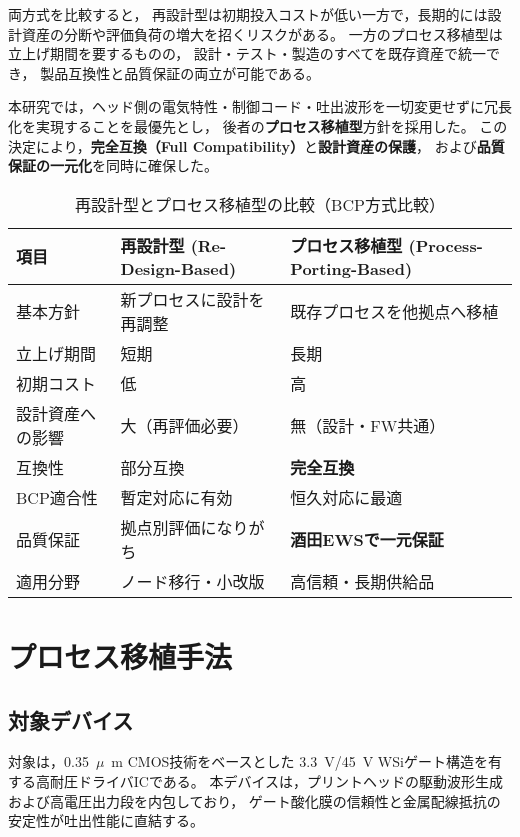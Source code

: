 \documentclass[conference]{IEEEtran}
\newcommand{\micro}{\ensuremath{\mu}}
\begin{document}
両方式を比較すると，
再設計型は初期投入コストが低い一方で，長期的には設計資産の分断や評価負荷の増大を招くリスクがある。
一方のプロセス移植型は立上げ期間を要するものの，
設計・テスト・製造のすべてを既存資産で統一でき，
製品互換性と品質保証の両立が可能である。

本研究では，ヘッド側の電気特性・制御コード・吐出波形を一切変更せずに冗長化を実現することを最優先とし，
後者の\textbf{プロセス移植型}方針を採用した。
この決定により，\textbf{完全互換（Full Compatibility）}と\textbf{設計資産の保護}，
および\textbf{品質保証の一元化}を同時に確保した。

\begin{table*}[t]
\centering
\caption{再設計型とプロセス移植型の比較（BCP方式比較）}
\label{tab:approach_compare}
\begin{tabular*}{\textwidth}{@{\extracolsep{\fill}} lll}
\toprule
\textbf{項目} & \textbf{再設計型 (Re-Design-Based)} & \textbf{プロセス移植型 (Process-Porting-Based)} \\
\midrule
基本方針 & 新プロセスに設計を再調整 & 既存プロセスを他拠点へ移植 \\
立上げ期間 & 短期 & 長期 \\
初期コスト & 低 & 高 \\
設計資産への影響 & 大（再評価必要） & 無（設計・FW共通） \\
互換性 & 部分互換 & \textbf{完全互換} \\
BCP適合性 & 暫定対応に有効 & 恒久対応に最適 \\
品質保証 & 拠点別評価になりがち & \textbf{酒田EWSで一元保証} \\
適用分野 & ノード移行・小改版 & 高信頼・長期供給品 \\
\bottomrule
\end{tabular*}
\end{table*}

\section{プロセス移植手法}

\subsection{対象デバイス}
対象は，\SI{0.35}{\micro\meter} CMOS技術をベースとした
\SI{3.3}{\volt}/\SI{45}{\volt} WSiゲート構造を有する高耐圧ドライバICである。
本デバイスは，プリントヘッドの駆動波形生成および高電圧出力段を内包しており，
ゲート酸化膜の信頼性と金属配線抵抗の安定性が吐出性能に直結する。
\end{document}
